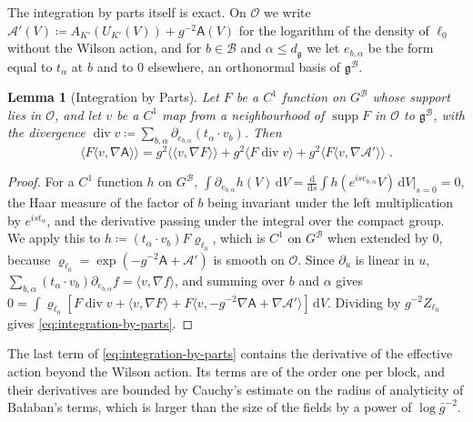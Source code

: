 \documentclass[11pt]{preprint}
\newcommand{\dd}{\mathrm{d}}
\numberwithin{equation}{section}
\newtheorem{lemma}[theorem]{Lemma}
\theoremstyle{definition}
\theoremstyle{remark}
\theoremstyle{plain}
\begin{document}
The integration by parts itself is exact. On $\mathcal O$ we write $\mathcal A'(V) \coloneqq A_{K'}(U_{K'}(V)) + g^{-2}\mathsf A(V)$ for the logarithm of the density of $\ell_0$ without the Wilson action, and for $b \in \mathcal B$ and $\alpha \leq d_{\mathfrak g}$ we let $e_{b,\alpha}$ be the form equal to $t_\alpha$ at $b$ and to $0$ elsewhere, an orthonormal basis of $\mathfrak g^{\mathcal B}$.

\begin{lemma}[Integration by Parts]\label{lem:integration-by-parts}
Let $F$ be a $C^1$ function on $G^{\mathcal B}$ whose support lies in $\mathcal O$, and let $v$ be a $C^1$ map from a neighbourhood of $\operatorname{supp}F$ in $\mathcal O$ to $\mathfrak g^{\mathcal B}$, with the divergence $\operatorname{div}v \coloneqq \sum_{b,\alpha}\partial_{e_{b,\alpha}}(t_\alpha \cdot v_b)$. Then
\begin{equation}\label{eq:integration-by-parts}
    \bigl\langle F\langle v, \nabla\mathsf A\rangle\bigr\rangle = g^2\bigl\langle\langle v, \nabla F\rangle\bigr\rangle + g^2\bigl\langle F\operatorname{div}v\bigr\rangle + g^2\bigl\langle F\langle v, \nabla\mathcal A'\rangle\bigr\rangle\;.
\end{equation}
\end{lemma}

\begin{proof}
For a $C^1$ function $h$ on $G^{\mathcal B}$, $\int\partial_{e_{b,\alpha}}h(V)\,\dd V = \frac{\dd}{\dd s}\int h(e^{ise_{b,\alpha}}V)\,\dd V|_{s=0} = 0$, the Haar measure of the factor of $b$ being invariant under the left multiplication by $e^{ist_\alpha}$, and the derivative passing under the integral over the compact group. We apply this to $h \coloneqq (t_\alpha \cdot v_b)F\varrho_{\ell_0}$, which is $C^1$ on $G^{\mathcal B}$ when extended by $0$, because $\varrho_{\ell_0} = \exp(-g^{-2}\mathsf A + \mathcal A')$ is smooth on $\mathcal O$. Since $\partial_u$ is linear in $u$, $\sum_{b,\alpha}(t_\alpha \cdot v_b)\partial_{e_{b,\alpha}}f = \langle v, \nabla f\rangle$, and summing over $b$ and $\alpha$ gives $0 = \int\varrho_{\ell_0}[F\operatorname{div}v + \langle v, \nabla F\rangle + F\langle v, -g^{-2}\nabla\mathsf A + \nabla\mathcal A'\rangle]\,\dd V$. Dividing by $g^{-2}Z_{\ell_0}$ gives \eqref{eq:integration-by-parts}.
\end{proof}

The last term of \eqref{eq:integration-by-parts} contains the derivative of the effective action beyond the Wilson action. Its terms are of the order one per block, and their derivatives are bounded by Cauchy's estimate on the radius of analyticity of Ba{\l}aban's terms, which is larger than the size of the fields by a power of $\log\bar g^{-2}$.
\end{document}
